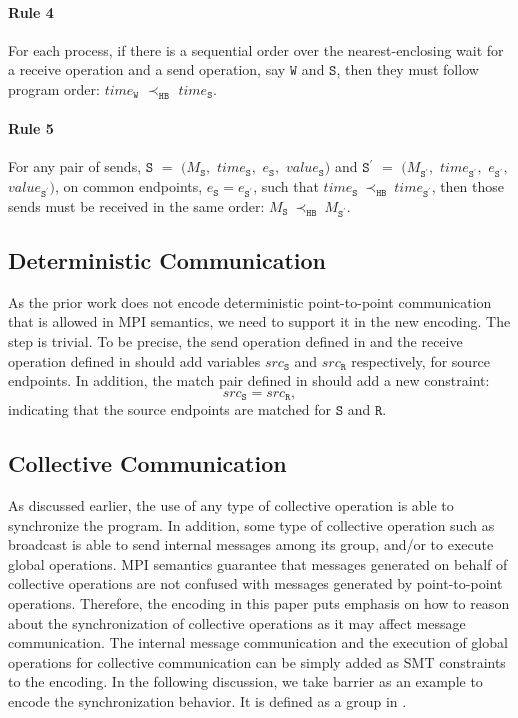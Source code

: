 \paragraph*{Rule 4} For each process, if there is a sequential order over the nearest-enclosing wait for a receive operation and a send operation, say $\mathtt{W}$ and $\mathtt{S}$, then they must follow program order: $\mathit{time}_\mathtt{W}$
$\prec_\mathtt{HB}$ $\mathit{time}_\mathtt{S}$.

\paragraph*{Rule 5} For any pair of sends, $\mathtt{S}$ $=$ $(M_\mathtt{S},$ $\mathit{time}_\mathtt{S},$ $e_\mathtt{S},$ $\mathit{value}_\mathtt{S})$ and
$\mathtt{S^\prime}$ $=$ $(M_\mathtt{S^\prime},$ $\mathit{time}_\mathtt{S^\prime},$ $e_\mathtt{S^\prime},$ $\mathit{value}_\mathtt{S^\prime})$, on common endpoints, $e_{\mathtt{S}}=e_{\mathtt{S^\prime}}$,
such that
$\mathit{time}_\mathtt{S}\ \mathrm{\prec_\mathtt{HB}}\ \mathit{time}_\mathtt{S^\prime}$,
then those sends must be received in the same order:
$M_{\mathtt{S}}\ \mathrm{\prec_{\mathtt{HB}}}\ M_{\mathtt{S^\prime}}$.

\subsection{Deterministic Communication}
As the prior work does not encode deterministic point-to-point communication that is allowed in MPI semantics, we need to support it in the new encoding. The step is trivial. To be precise, the send operation defined in  and the receive operation defined in  should add variables $src_\mathtt{S}$ and $src_\mathtt{R}$ respectively, for source endpoints. In addition, the match pair defined in  should add a new constraint: 
\begin{equation*}
src_\mathtt{S} = src_\mathtt{R}, 
\end{equation*}
indicating that the source endpoints are matched for $\mathtt{S}$ and $\mathtt{R}$.

\subsection{Collective Communication}
As discussed earlier, the use of any type of collective operation is able to synchronize the program. In addition, some type of collective operation such as broadcast is able to send internal messages among its group, and/or to execute global operations. MPI semantics guarantee that messages generated on behalf of collective operations are not confused with messages generated by point-to-point operations. Therefore, the encoding in this paper puts emphasis on how to reason about the synchronization of collective operations as it may affect message communication. The internal message communication and the execution of global operations for collective communication can be simply added as SMT constraints to the encoding. In the following discussion, we take barrier as an example to encode the synchronization behavior. It is defined as a group in . 

